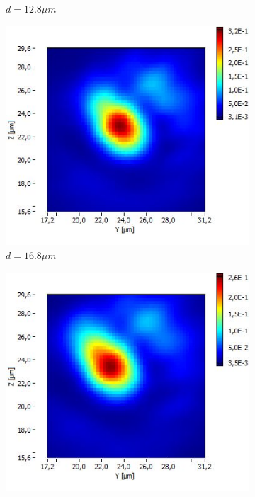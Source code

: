 \documentclass[a4paper,11pt]{article}
\begin{document}
\begin{figure}[htb]
\begin{subfigure}[b]{.20\linewidth}
    \caption{$d=12.8\mu m$}
  \end{subfigure}
  \begin{subfigure}[b]{.20\linewidth}
    \centering
    \includegraphics[width=\textwidth]{Fibre5/scan_027_g1.jpg}
    \caption{$d=16.8\mu m$}
  \end{subfigure}
  \begin{subfigure}[b]{.20\linewidth}
    \centering
    \includegraphics[width=\textwidth]{Fibre5/scan_028_g1.jpg}

\end{subfigure}
\end{figure}
\end{document}
